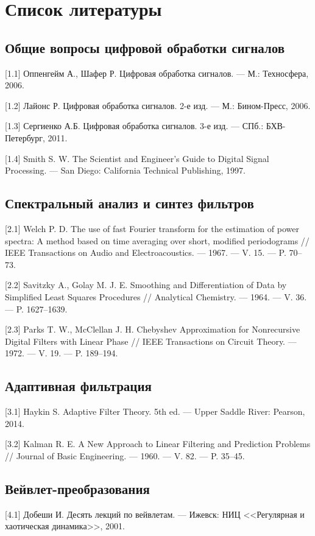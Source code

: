 \documentclass[12pt,a4paper,openany]{book}
\begin{document}
\chapter*{Список литературы}

\section*{Общие вопросы цифровой обработки сигналов}
[1.1] Оппенгейм А., Шафер Р. Цифровая обработка сигналов. --- М.: Техносфера, 2006.

[1.2] Лайонс Р. Цифровая обработка сигналов. 2-е изд. --- М.: Бином-Пресс, 2006.

[1.3] Сергиенко А.Б. Цифровая обработка сигналов. 3-е изд. --- СПб.: БХВ-Петербург, 2011.

[1.4] Smith S. W. The Scientist and Engineer's Guide to Digital Signal Processing. --- San Diego: California Technical Publishing, 1997.

\section*{Спектральный анализ и синтез фильтров}
[2.1] Welch P. D. The use of fast Fourier transform for the estimation of power spectra: A method based on time averaging over short, modified periodograms // IEEE Transactions on Audio and Electroacoustics. --- 1967. --- V. 15. --- P. 70–73.

[2.2] Savitzky A., Golay M. J. E. Smoothing and Differentiation of Data by Simplified Least Squares Procedures // Analytical Chemistry. --- 1964. --- V. 36. --- P. 1627–1639.

[2.3] Parks T. W., McClellan J. H. Chebyshev Approximation for Nonrecursive Digital Filters with Linear Phase // IEEE Transactions on Circuit Theory. --- 1972. --- V. 19. --- P. 189–194.

\section*{Адаптивная фильтрация}
[3.1] Haykin S. Adaptive Filter Theory. 5th ed. --- Upper Saddle River: Pearson, 2014.

[3.2] Kalman R. E. A New Approach to Linear Filtering and Prediction Problems // Journal of Basic Engineering. --- 1960. --- V. 82. --- P. 35–45.

\section*{Вейвлет-преобразования}
[4.1] Добеши И. Десять лекций по вейвлетам. --- Ижевск: НИЦ <<Регулярная и хаотическая динамика>>, 2001.
\end{document}
